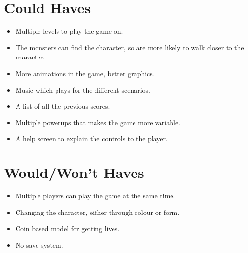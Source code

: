 \section{Could Haves}

\begin{itemize}
\itemsep0em 
  \item Multiple levels to play the game on.
  \item The monsters can find the character, so are more likely to walk closer to the character.
  \item More animations in the game, better graphics.
  \item Music which plays for the different scenarios.  
  \item A list of all the previous scores.
  \item Multiple powerups that makes the game more variable.
  \item A help screen to explain the controls to the player.
\end{itemize}

\section{Would/Won't Haves}
\begin{itemize}
\itemsep0em 
	\item Multiple players can play the game at the same time.
	\item Changing the character, either through colour or form.
	\item Coin based model for getting lives.
	\item No save system.
\end{itemize}
